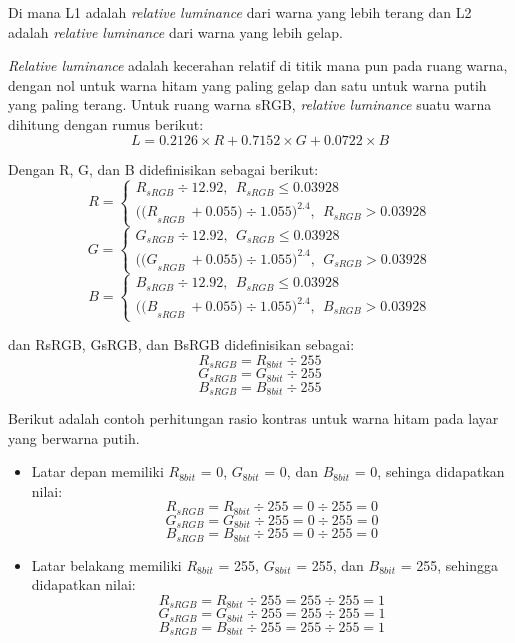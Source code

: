 Di mana L1 adalah \textit{relative luminance} dari warna yang lebih terang dan L2 adalah \textit{relative luminance} dari warna yang lebih gelap.

\textit{Relative luminance} adalah kecerahan relatif di titik mana pun pada ruang warna, dengan nol untuk warna hitam yang paling gelap dan satu untuk warna putih yang paling terang. Untuk ruang warna sRGB, \textit{relative luminance} suatu warna dihitung dengan rumus berikut:
\[
	L = 0.2126 \times R + 0.7152 \times G + 0.0722 \times B
\]

Dengan R, G, dan B didefinisikan sebagai berikut:
\[
	R=\left\{
	\begin{array}{rr}
	R_{sRGB}\div 12.92,\ \ R_{sRGB}\le 0.03928 \\ 
	{{((R}_{sRGB}\ +0.055)\div 1.055)}^{2.4},\ \ R_{sRGB}>0.03928
	\end{array}
	\right.
\]
\[
	G=\left\{
	\begin{array}{rr}
	G_{sRGB}\div 12.92,\ \ G_{sRGB}\le 0.03928 \\ 
	{{((G}_{sRGB}\ +0.055)\div 1.055)}^{2.4},\ \ G_{sRGB}>0.03928
	\end{array}
	\right.
\]
\[
	B=\left\{
	\begin{array}{rr}
	B_{sRGB}\div 12.92,\ \ B_{sRGB}\le 0.03928 \\ 
	{{((B}_{sRGB}\ +0.055)\div 1.055)}^{2.4},\ \ B_{sRGB}>0.03928
	\end{array}
	\right.
\]

dan RsRGB, GsRGB, dan BsRGB didefinisikan sebagai:
\[
	R_{sRGB} = R_{8bit}\div 255
\]
\[
	G_{sRGB} = G_{8bit}\div 255
\]
\[
	B_{sRGB} = B_{8bit}\div 255
\]

Berikut adalah contoh perhitungan rasio kontras untuk warna hitam pada layar yang berwarna putih.

\begin{itemize}
	\item Latar depan memiliki $R_{8bit}$ = 0, $G_{8bit}$ = 0, dan $B_{8bit}$ = 0, sehinga didapatkan nilai: 
			\[
				R_{sRGB} = R_{8bit}\div 255 = 0\div 255 = 0
			\]
			\[
				G_{sRGB} = G_{8bit}\div 255 = 0\div 255 = 0
			\]
			\[
				B_{sRGB} = B_{8bit}\div 255 = 0\div 255 = 0
			\]
	\item Latar belakang memiliki $R_{8bit}$ = 255, $G_{8bit}$ = 255, dan $B_{8bit}$ = 255, sehingga didapatkan nilai:
			\[
				R_{sRGB} = R_{8bit}\div 255 = 255\div 255 = 1
			\]
			\[
				G_{sRGB} = G_{8bit}\div 255 = 255\div 255 = 1
			\]
			\[
				B_{sRGB} = B_{8bit}\div 255 = 255\div 255 = 1
			\]
\end{itemize}

